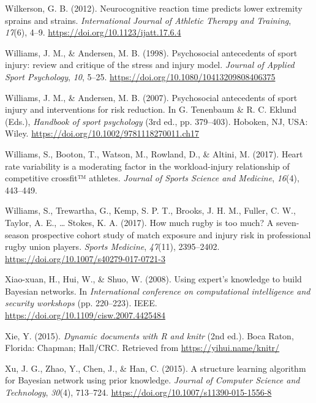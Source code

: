 \documentclass[
  english,
  man,floatsintext]{apa6}
\begin{document}
\leavevmode\hypertarget{ref-Wilkerson2012a}{}%
Wilkerson, G. B. (2012). Neurocognitive reaction time predicts lower extremity sprains and strains. \emph{International Journal of Athletic Therapy and Training}, \emph{17}(6), 4--9. \url{https://doi.org/10.1123/ijatt.17.6.4}

\leavevmode\hypertarget{ref-Williams1998}{}%
Williams, J. M., \& Andersen, M. B. (1998). Psychosocial antecedents of sport injury: review and critique of the stress and injury model. \emph{Journal of Applied Sport Psychology}, \emph{10}, 5--25. \url{https://doi.org/10.1080/10413209808406375}

\leavevmode\hypertarget{ref-Williams2007}{}%
Williams, J. M., \& Andersen, M. B. (2007). Psychosocial antecedents of sport injury and interventions for risk reduction. In G. Tenenbaum \& R. C. Eklund (Eds.), \emph{Handbook of sport psychology} (3rd ed., pp. 379--403). Hoboken, NJ, USA: Wiley. \url{https://doi.org/10.1002/9781118270011.ch17}

\leavevmode\hypertarget{ref-Williams2017}{}%
Williams, S., Booton, T., Watson, M., Rowland, D., \& Altini, M. (2017). Heart rate variability is a moderating factor in the workload-injury relationship of competitive crossfit™ athletes. \emph{Journal of Sports Science and Medicine}, \emph{16}(4), 443--449.

\leavevmode\hypertarget{ref-Williams2017b}{}%
Williams, S., Trewartha, G., Kemp, S. P. T., Brooks, J. H. M., Fuller, C. W., Taylor, A. E., \ldots{} Stokes, K. A. (2017). How much rugby is too much? A seven-season prospective cohort study of match exposure and injury risk in professional rugby union players. \emph{Sports Medicine}, \emph{47}(11), 2395--2402. \url{https://doi.org/10.1007/s40279-017-0721-3}

\leavevmode\hypertarget{ref-Xiao-xuan2007}{}%
Xiao-xuan, H., Hui, W., \& Shuo, W. (2008). Using expert's knowledge to build Bayesian networks. In \emph{International conference on computational intelligence and security workshops} (pp. 220--223). IEEE. \url{https://doi.org/10.1109/cisw.2007.4425484}

\leavevmode\hypertarget{ref-R-knitr}{}%
Xie, Y. (2015). \emph{Dynamic documents with R and knitr} (2nd ed.). Boca Raton, Florida: Chapman; Hall/CRC. Retrieved from \url{https://yihui.name/knitr/}

\leavevmode\hypertarget{ref-Xu2015}{}%
Xu, J. G., Zhao, Y., Chen, J., \& Han, C. (2015). A structure learning algorithm for Bayesian network using prior knowledge. \emph{Journal of Computer Science and Technology}, \emph{30}(4), 713--724. \url{https://doi.org/10.1007/s11390-015-1556-8}
\end{document}
